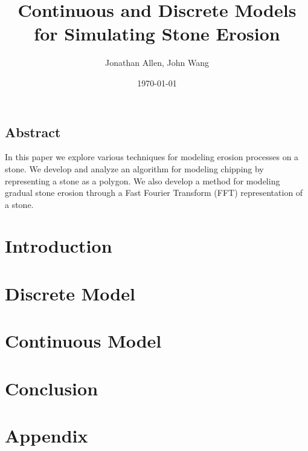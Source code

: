 \documentclass[12pt]{amsart}   %
\begin{document}
\graphicspath{ {figures/} }

\title[Shape of Stones]{Continuous and Discrete Models for Simulating Stone Erosion}
 
\author{Jonathan Allen, John Wang}
\date{\today}

\maketitle

\subsection*{Abstract}

In this paper we explore various techniques for modeling erosion processes on a stone. We develop and analyze an algorithm for modeling chipping by representing a stone as a polygon. We also develop a method for modeling gradual stone erosion through a Fast Fourier Transform (FFT) representation of a stone.

\section{Introduction}


\section{Discrete Model}


\section{Continuous Model}


\section{Conclusion}


\section*{Appendix}



\end{document}
